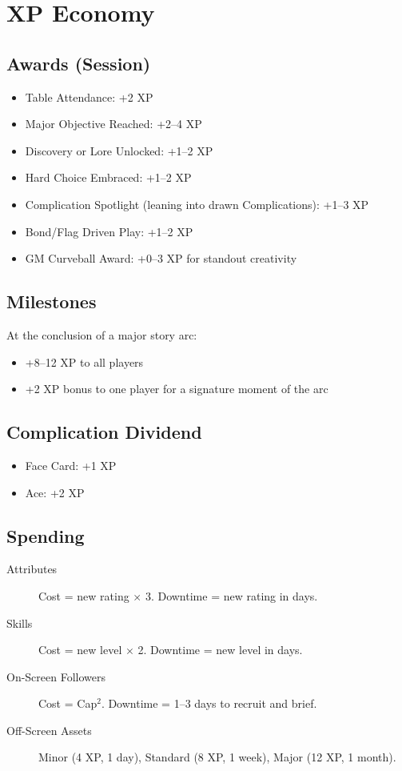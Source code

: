 \section{XP Economy}

\subsection{Awards (Session)}

\begin{itemize}
\item Table Attendance: +2 XP
\item Major Objective Reached: +2--4 XP
\item Discovery or Lore Unlocked: +1--2 XP
\item Hard Choice Embraced: +1--2 XP
\item Complication Spotlight (leaning into drawn Complications): +1--3 XP
\item Bond/Flag Driven Play: +1--2 XP
\item GM Curveball Award: +0--3 XP for standout creativity
\end{itemize}

\subsection{Milestones}

At the conclusion of a major story arc:
\begin{itemize}
\item +8--12 XP to all players
\item +2 XP bonus to one player for a signature moment of the arc
\end{itemize}

\subsection{Complication Dividend}
\begin{itemize}
    \item Face Card: +1 XP
    \item Ace: +2 XP
\end{itemize}

\subsection{Spending}

\begin{description}
\item[Attributes] Cost = new rating $\times$ 3. Downtime = new rating in days.
\item[Skills] Cost = new level $\times$ 2. Downtime = new level in days.
\item[On-Screen Followers] Cost = Cap$^2$. Downtime = 1--3 days to recruit and brief.
\item[Off-Screen Assets] Minor (4 XP, 1 day), Standard (8 XP, 1 week), Major (12 XP, 1 month).
\end{description}


